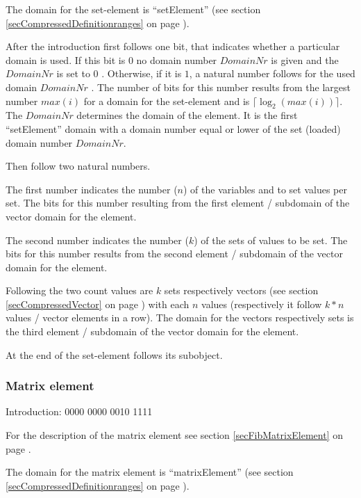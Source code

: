 The domain for the set-element is ``setElement'' (see section \ref{secCompressedDefinitionranges} on page \pageref{secCompressedDefinitionranges}).

After the introduction first follows one bit, that indicates whether a particular domain is used. If this bit is $0$ no domain number $DomainNr$ is given and the $DomainNr$ is set to 0 . Otherwise, if it is $1$, a natural number follows for the used domain $DomainNr$ . The number of bits for this number results from the largest number $max(i)$ for a domain for the set-element and is $\lceil \log_2( max(i) ) \rceil$.
The $DomainNr$ determines the domain of the element. It is the first ``setElement'' domain with a domain number equal or lower of the set (loaded) domain number $DomainNr$.

Then follow two natural numbers.

The first number indicates the number ($n$) of the variables and to set values per set. The bits for this number resulting from the first element / subdomain of the vector domain for the element.

The second number indicates the number ($k$) of the sets of values to be set. The bits for this number results from the second element / subdomain of the vector domain for the element.

Following the two count values are $k$ sets respectively vectors (see section \ref{secCompressedVector} on page \pageref{secCompressedVector}) with each $n$ values (respectively it follow $k * n$ values / vector elements in a row). The domain for the vectors respectively sets is the third element / subdomain of the vector domain for the element.

At the end of the set-element follows its subobject.



\subsubsection{Matrix element}
\label{secCompressedFibMatrix}

Introduction: 0000 0000 0010 1111

\bigskip\noindent
For the description of the matrix element see section \ref{secFibMatrixElement} on page \pageref{secFibMatrixElement} .

The domain for the matrix element is ``matrixElement'' (see section \ref{secCompressedDefinitionranges} on page \pageref{secCompressedDefinitionranges}).

